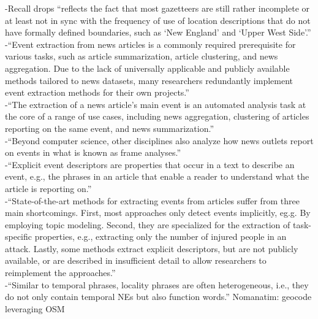 -{\color{orange}Recall drops “reflects the fact that most gazetteers are still rather incomplete or at least not in sync with the frequency of use of location descriptions that do not have formally defined boundaries, such as ‘New England’ and ‘Upper West Side’.”\cite{Lieberman2010}}\\
-{\color{orange}“Event extraction from news articles is a commonly required prerequisite for various tasks, such as article summarization, article clustering, and news aggregation. Due to the lack of universally applicable and publicly available methods tailored to news datasets, many researchers redundantly implement event extraction methods for their own projects.”\cite{Hamborg2019}}\\
-{\color{orange}“The extraction of a news article’s main event is an automated analysis task at the core of a range of use cases, including news aggregation, clustering of articles reporting on the same event, and news summarization.”\cite{Hamborg2019}}\\
-{\color{orange}“Beyond computer science, other disciplines also analyze how news outlets report on events in what is known as frame analyses.”\cite{Hamborg2019}}\\
-{\color{orange}“Explicit event descriptors are properties that occur in a text to describe an event, e.g., the phrases in an article that enable a reader to understand what the article is reporting on.”\cite{Hamborg2019}}\\
-{\color{orange}“State-of-the-art  methods for extracting events from articles suffer from three main shortcomings. First, most approaches only detect events implicitly, eg.g. By  employing topic modeling. Second, they are specialized for the extraction of task-specific properties, e.g., extracting only the number of injured people in an attack. Lastly, some methods extract explicit descriptors, but are not publicly available, or are described in insufficient detail to allow researchers to reimplement the approaches.” \cite{Hamborg2019}}\\
-{\color{orange}“Similar to temporal phrases, locality phrases are often heterogeneous, i.e., they do not only contain temporal NEs but also function words.” Nomanatim: geocode leveraging OSM\cite{Hamborg2019}}\\
